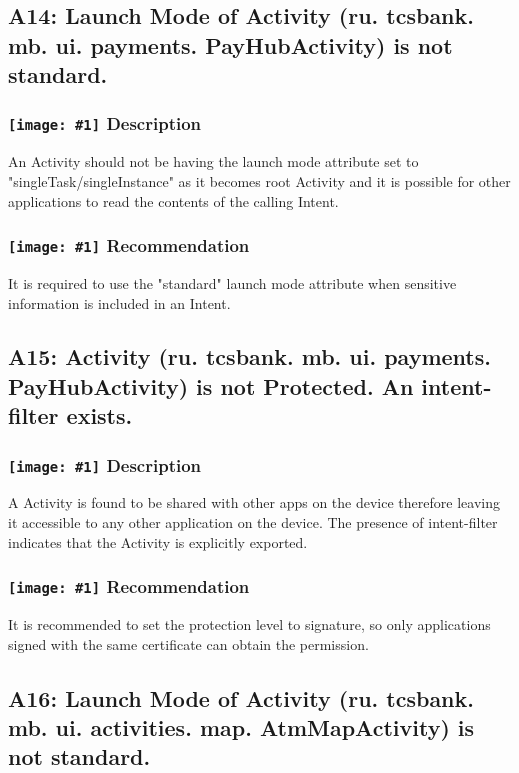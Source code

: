 \documentclass[12p]{article}
\newcommand{\icon}[1]{\texttt{[image: \#1]}}
\begin{document}
\subsection{A14: Launch Mode of Activity (ru. tcsbank. mb. ui. payments. PayHubActivity) is not standard.}
\subsubsection*{\protect\icon{/home/miki/Documents/GITHUB/AndroidPermissions/python/vulns/report_icons/basic_sheet.png} Description}
An Activity should not be having the launch mode attribute set to "singleTask/singleInstance" as it becomes root Activity and it is possible for other applications to read the contents of the calling Intent.
\subsubsection*{\protect\icon{/home/miki/Documents/GITHUB/AndroidPermissions/python/vulns/report_icons/basic_todo.png} Recommendation}
It is required to use the "standard" launch mode attribute when sensitive information is included in an Intent.
\subsection{A15: Activity (ru. tcsbank. mb. ui. payments. PayHubActivity) is not Protected. An intent-filter exists.}
\subsubsection*{\protect\icon{/home/miki/Documents/GITHUB/AndroidPermissions/python/vulns/report_icons/basic_sheet.png} Description}
A  Activity is found to be shared with other apps on the device therefore leaving it accessible to any other application on the device. The presence of intent-filter indicates that the Activity is explicitly exported.
\subsubsection*{\protect\icon{/home/miki/Documents/GITHUB/AndroidPermissions/python/vulns/report_icons/basic_todo.png} Recommendation}
It is recommended to set the protection level to signature, so only applications signed with the same certificate can obtain the permission.
\subsection{A16: Launch Mode of Activity (ru. tcsbank. mb. ui. activities. map. AtmMapActivity) is not standard.}
\end{document}
